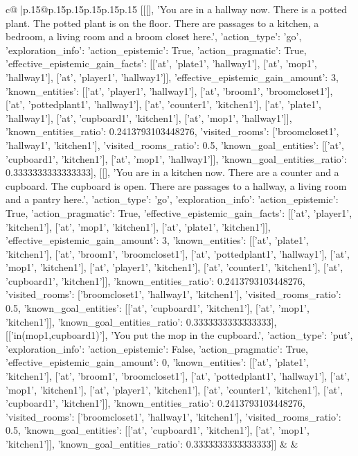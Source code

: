 \documentclass{article}
\begin{document}
{\begin{supertabular}{c@{$\;$}|p{.15\linewidth}@{}p{.15\linewidth}p{.15\linewidth}p{.15\linewidth}p{.15\linewidth}p{.15\linewidth}}
{{{	 [[[], 'You are in a hallway now. There is a potted plant. The potted plant is on the floor. There are passages to a kitchen, a bedroom, a living room and a broom closet here.', {'action_type': 'go', 'exploration_info': {'action_epistemic': True, 'action_pragmatic': True, 'effective_epistemic_gain_facts': [['at', 'plate1', 'hallway1'], ['at', 'mop1', 'hallway1'], ['at', 'player1', 'hallway1']], 'effective_epistemic_gain_amount': 3, 'known_entities': [['at', 'player1', 'hallway1'], ['at', 'broom1', 'broomcloset1'], ['at', 'pottedplant1', 'hallway1'], ['at', 'counter1', 'kitchen1'], ['at', 'plate1', 'hallway1'], ['at', 'cupboard1', 'kitchen1'], ['at', 'mop1', 'hallway1']], 'known_entities_ratio': 0.2413793103448276, 'visited_rooms': ['broomcloset1', 'hallway1', 'kitchen1'], 'visited_rooms_ratio': 0.5, 'known_goal_entities': [['at', 'cupboard1', 'kitchen1'], ['at', 'mop1', 'hallway1']], 'known_goal_entities_ratio': 0.3333333333333333}}], [[], 'You are in a kitchen now. There are a counter and a cupboard. The cupboard is open. There are passages to a hallway, a living room and a pantry here.', {'action_type': 'go', 'exploration_info': {'action_epistemic': True, 'action_pragmatic': True, 'effective_epistemic_gain_facts': [['at', 'player1', 'kitchen1'], ['at', 'mop1', 'kitchen1'], ['at', 'plate1', 'kitchen1']], 'effective_epistemic_gain_amount': 3, 'known_entities': [['at', 'plate1', 'kitchen1'], ['at', 'broom1', 'broomcloset1'], ['at', 'pottedplant1', 'hallway1'], ['at', 'mop1', 'kitchen1'], ['at', 'player1', 'kitchen1'], ['at', 'counter1', 'kitchen1'], ['at', 'cupboard1', 'kitchen1']], 'known_entities_ratio': 0.2413793103448276, 'visited_rooms': ['broomcloset1', 'hallway1', 'kitchen1'], 'visited_rooms_ratio': 0.5, 'known_goal_entities': [['at', 'cupboard1', 'kitchen1'], ['at', 'mop1', 'kitchen1']], 'known_goal_entities_ratio': 0.3333333333333333}}], [['in(mop1,cupboard1)'], 'You put the mop in the cupboard.', {'action_type': 'put', 'exploration_info': {'action_epistemic': False, 'action_pragmatic': True, 'effective_epistemic_gain_amount': 0, 'known_entities': [['at', 'plate1', 'kitchen1'], ['at', 'broom1', 'broomcloset1'], ['at', 'pottedplant1', 'hallway1'], ['at', 'mop1', 'kitchen1'], ['at', 'player1', 'kitchen1'], ['at', 'counter1', 'kitchen1'], ['at', 'cupboard1', 'kitchen1']], 'known_entities_ratio': 0.2413793103448276, 'visited_rooms': ['broomcloset1', 'hallway1', 'kitchen1'], 'visited_rooms_ratio': 0.5, 'known_goal_entities': [['at', 'cupboard1', 'kitchen1'], ['at', 'mop1', 'kitchen1']], 'known_goal_entities_ratio': 0.3333333333333333}}]] 
	  } 
	   } 
	   } 
	 & & \\ 
 


\end{supertabular}}
\end{document}
